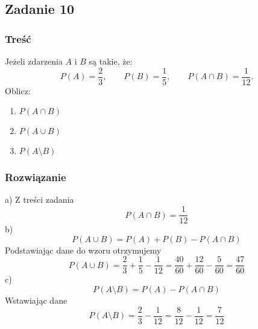 \subsection{Zadanie 10}

\subsubsection*{Treść}
Jeżeli zdarzenia $A$ i $B$ są takie, że:
$$
P(A) = \frac{2}{3}, \quad \quad P(B) = \frac{1}{5}, \quad \quad P(A \cap B) = \frac{1}{12}.
$$ 
Oblicz:
\begin{enumerate}[label=\alph*)] 
\item $P(A \cap B)$
\item $P(A \cup B)$
\item $P(A \setminus B)$
\end{enumerate} 

\subsubsection*{Rozwiązanie}
a) Z treści zadania 
$$P({A}\cap{B})=\frac{1}{12}$$
b)$$P({A}\cup{B})=P(A)+P(B)-P({A}\cap{B})$$
Podstawiając dane do wzoru otrzymujemy
$$P({A}\cup{B})=\frac{2}{3}+\frac{1}{5}-\frac{1}{12}=\frac{40}{60}+\frac{12}{60}-\frac{5}{60}=\frac{47}{60}$$
c)$$P({A}\setminus{B})=P(A)-P({A}\cap{B})$$
Wstawiając dane
$$P({A}\setminus{B})=\frac{2}{3}-\frac{1}{12}=\frac{8}{12}-\frac{1}{12}=\frac{7}{12}$$

